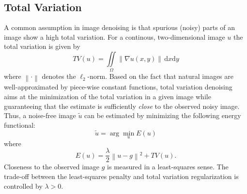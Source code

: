 \documentclass{paper}
\begin{document}
\subsection{Total Variation}
A common assumption in image denoising is that spurious (noisy) parts of an image show a high total variation. For a continous, two-dimensional image \begin{math}u\end{math} the total variation is given by
\begin{equation}
TV(u) = \iint\limits_{\Omega} \! \left\|\nabla u(x,y)\right\| \, \mathrm{d}x\mathrm{d}y
\label{eq:TVnorm}
\end{equation}
where \begin{math}\left\|\cdot\right\|\end{math} denotes the \begin{math}\ell_{2}\end{math}-norm. Based on the fact that natural images are well-approximated by piece-wise constant functions, total variation denoising aims at the minimization of the total variation in a given image while guaranteeing that the estimate is sufficiently \textit{close} to the observed noisy image. Thus, a noise-free image \begin{math}\tilde{u}\end{math} can be estimated by minimizing the following energy functional:
\begin{equation}
\tilde{u} = \arg \min_{u}E(u)
\label{eq:minEnergy}
\end{equation}
where
\begin{equation}
E(u) = \frac{\lambda}{2}\left\|u-g\right\|^{2} + TV(u).
\label{eq:Energy}
\end{equation}
Closeness to the observed image \begin{math}g\end{math} is measured in a least-squares sense. The trade-off between the least-squares penalty and total variation regularization is controlled by \begin{math}\lambda>0\end{math}.
\end{document}

